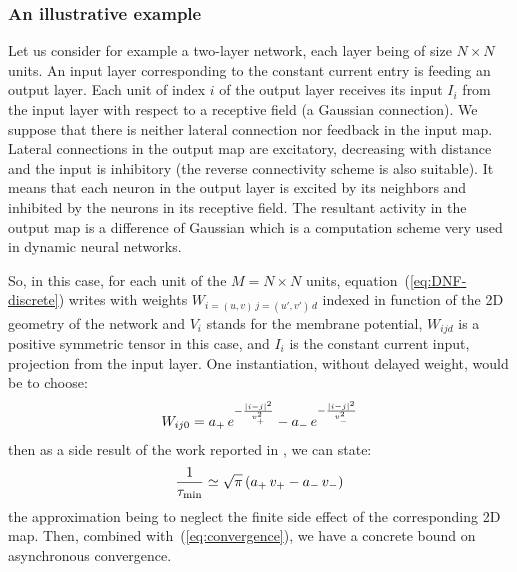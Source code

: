 \subsubsection*{An illustrative example}

Let us consider for example a two-layer network, each layer being of size $N \times N$ units. 
An input layer corresponding to the constant current entry is feeding an output layer. 
Each unit of index $i$ of the output layer receives its input $I_{i}$ from the input layer with respect to a receptive field (a Gaussian connection). 
We suppose that there is neither lateral connection nor feedback in the input map. Lateral connections in the output map are excitatory, decreasing with distance and the input is inhibitory (the reverse connectivity scheme is also suitable). It means that each neuron in the output layer is excited by its neighbors and inhibited by the neurons in its receptive field. The resultant activity in the output map is a difference of Gaussian which is a computation scheme very used in dynamic neural networks.


So, in this case, for each unit of the $M = N \times N$ units, equation~(\ref{eq:DNF-discrete}) writes with weights $W_{i=(u,v)\,j=(u',v')\,d}$ indexed in function of the 2D geometry of the network and $V_{i}$ stands for the membrane potential, $W_{ijd}$ is a positive symmetric tensor in this case, and $I_{i}$ is the constant current input, projection from the input layer. One instantiation, without delayed weight, would be to choose:
\begin{align}
W_{ij0} = a_+ \, e^{-\frac{|i - j|^2}{v_+^2}} -  a_- \, e^{-\frac{|i - j|^2}{v_-^2}} \notag
\end{align}
then as a side result of the work reported in \cite{Alexandre:2009}, we can state:
\begin{align}
\frac{1}{\tau_{\min}} \simeq \sqrt{\pi} \, (a_+ \, v_+ - a_- \, v_-) \notag
\end{align}
the approximation being to neglect the finite side effect of the corresponding 2D map. 
Then, combined with~(\ref{eq:convergence}), we have a concrete bound on asynchronous convergence.\\

